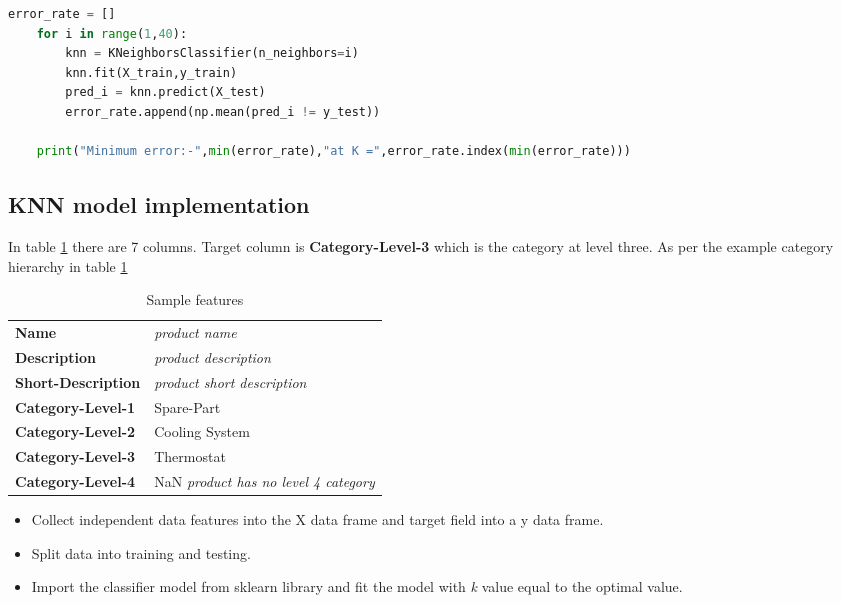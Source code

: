 \begin{lstlisting}[language=Python, caption={Find optimal \textit{k} value in \acl{KNN} }]
    error_rate = []
    for i in range(1,40):
        knn = KNeighborsClassifier(n_neighbors=i)
        knn.fit(X_train,y_train)
        pred_i = knn.predict(X_test)
        error_rate.append(np.mean(pred_i != y_test))

    print("Minimum error:-",min(error_rate),"at K =",error_rate.index(min(error_rate)))
\end{lstlisting}



\subsection{\acs{KNN} model implementation}

In table \ref{table:KNN_implementation} there are 7 columns. Target column is \textbf{Category-Level-3} which is the category at level three.
As per the example category hierarchy in table \ref{table:KNN_implementation} 



\begin{table}[h]
    \centering
    \caption{Sample features }
    \label{table:KNN_implementation}
    \begin{tabular}{ll}
        \toprule     
        \textbf{Name}& \textit{product name} \\
        \textbf{Description}& \textit{product description} \\
        \textbf{Short-Description}& \textit{product short description} \\
        \textbf{Category-Level-1}& Spare-Part \\
        \textbf{Category-Level-2}& Cooling System \\
        \textbf{Category-Level-3}& Thermostat \\
        \textbf{Category-Level-4}& NaN \textit{product has no level 4 category} \\
        \bottomrule
    \end{tabular}

\end{table}

\begin{itemize}
    \item Collect independent data features into the X data frame and target field into a y data frame.
    \item  Split data into training and testing. 
    \item  Import the classifier model from sklearn library and fit the model with  \textit{k} value equal to the optimal value.
\end{itemize}

